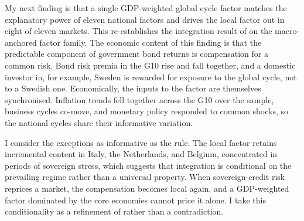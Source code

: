 \bigskip
My next finding is that a single GDP-weighted global cycle factor matches
the explanatory power of eleven national factors and drives the local factor
out in eight of eleven markets. This re-establishes the integration result
of \citet{dahlquist2013} on the macro-anchored factor family. The economic
content of this finding is that the predictable component of government bond
returns is compensation for a common risk. Bond risk premia in the G10 rise
and fall together, and a domestic investor in, for example, Sweden is
rewarded for exposure to the global cycle, not to a Swedish one. Economically, the
inputs to the factor are themselves synchronised. Inflation trends fell
together across the G10 over the sample, business cycles co-move, and
monetary policy responded to common shocks, so the national cycles share
their informative variation.

I consider the exceptions as informative as the rule. The local factor
retains incremental content in Italy, the Netherlands, and Belgium,
concentrated in periods of sovereign stress, which suggests that integration
is conditional on the prevailing regime rather than a universal property. When sovereign-credit risk reprices a market, the
compensation becomes local again, and a GDP-weighted factor dominated by the
core economies cannot price it alone. I take this conditionality as a
refinement of \citet{dahlquist2013} rather than a contradiction.

